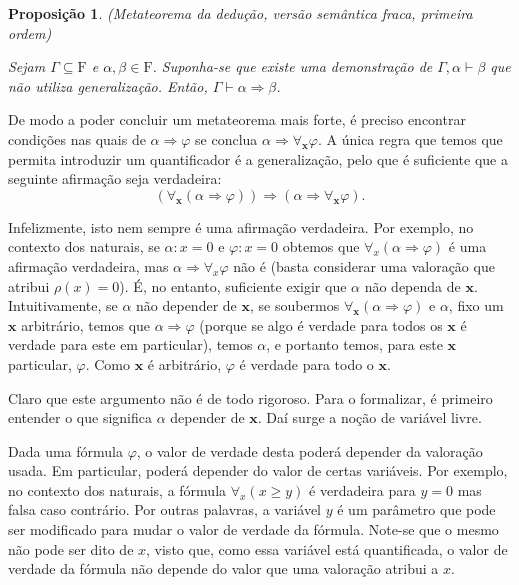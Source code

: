 \documentclass{report}
\newtheorem*{prop*}{Proposição}
\theoremstyle{definition}
\theoremstyle{remark}
\renewcommand{\bf}[1]{\mathbf{#1}}
\newcommand{\F}{\mathrm{F}}
\newcommand{\imply}{\mathbin{\Rightarrow}}
\begin{document}
	\begin{prop*}
	(Metateorema da dedução, versão semântica fraca, primeira ordem)
	
	Sejam $\Gamma \subseteq \F$ e $\alpha, \beta \in \F$. Suponha-se que existe uma demonstração de $\Gamma, \alpha \vdash \beta$ que não utiliza generalização. Então, $\Gamma \vdash \alpha \imply \beta$.
	\end{prop*}
	
	De modo a poder concluir um metateorema mais forte, é preciso encontrar condições nas quais de $\alpha \imply \varphi$ se conclua $\alpha \imply \forall_{\bf x} \varphi$. A única regra que temos que permita introduzir um quantificador é a generalização, pelo que é suficiente que a seguinte afirmação seja verdadeira:
	\begin{equation}\label{folax4}
	(\forall_{\bf x} (\alpha \imply \varphi)) \imply (\alpha \imply \forall_{\bf x} \varphi).
	\end{equation}
	
	Infelizmente, isto nem sempre é uma afirmação verdadeira. Por exemplo, no contexto dos naturais, se $\alpha : x = 0$ e $\varphi : x = 0$ obtemos que $\forall_x (\alpha \imply \varphi)$ é uma afirmação verdadeira, mas $\alpha \imply \forall_x \varphi$ não é (basta considerar uma valoração que atribui $\rho(x) = 0$). É, no entanto, suficiente exigir que $\alpha$ não dependa de $\bf x$. Intuitivamente, se $\alpha$ não depender de $\bf x$, se soubermos $\forall_{\bf x} (\alpha \imply \varphi)$ e $\alpha$, fixo um $\bf x$ arbitrário, temos que $\alpha \imply \varphi$ (porque se algo é verdade para todos os $\bf x$ é verdade para este em particular), temos $\alpha$, e portanto temos, para este $\bf x$ particular, $\varphi$. Como $\bf x$ é arbitrário, $\varphi$ é verdade para todo o $\bf x$.
	
	Claro que este argumento não é de todo rigoroso. Para o formalizar, é primeiro entender o que significa $\alpha$ depender de $\bf x$. Daí surge a noção de variável livre.
	
	Dada uma fórmula $\varphi$, o valor de verdade desta poderá depender da valoração usada. Em particular, poderá depender do valor de certas variáveis. Por exemplo, no contexto dos naturais, a fórmula $\forall_x (x \geq y)$ é verdadeira para $y = 0$ mas falsa caso contrário. Por outras palavras, a variável $y$ é um parâmetro que pode ser modificado para mudar o valor de verdade da fórmula. Note-se que o mesmo não pode ser dito de $x$, visto que, como essa variável está quantificada, o valor de verdade da fórmula não depende do valor que uma valoração atribui a $x$.
	
\end{document}
